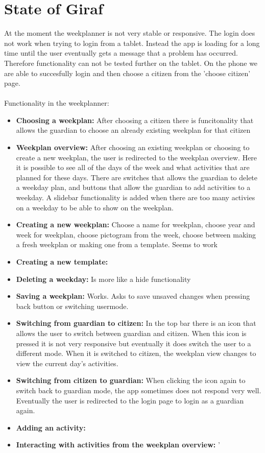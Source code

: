 \section{State of Giraf}
At the moment the weekplanner is not very stable or responsive. The login does not work when trying to login from a tablet. 
Instead the app is loading for a long time until the user eventually gets a message that a problem has occurred. 
Therefore functionality can not be tested further on the tablet. 
On the phone we are able to succesfully login and then choose a citizen from the 'choose citizen' page.
\\\\
Functionality in the weekplanner:
\begin{itemize}
    \item \textbf{Choosing a weekplan:} After choosing a citizen there is funcitonality that allows the guardian to choose an already existing weekplan for that citizen
    \\
    \item \textbf{Weekplan overview:} After choosing an existing weekplan or choosing to create a new weekplan, the user is redirected to the weekplan overview. 
    Here it is possible to see all of the days of the week and what activities that are planned for these days. There are switches that allows the guardian to delete a weekday plan, and buttons that allow the guardian to add activities to a weekday. 
    A slidebar functionality is added when there are too many activies on a weekday to be able to show on the weekplan.
    \\
    \item \textbf{Creating a new weekplan:} Choose a name for weekplan, choose year and week for weekplan, choose pictogram from the week, choose between making a fresh weekplan or making one from a template. Seems to work
    \item \textbf{Creating a new template:} 
    \item \textbf{Deleting a weekday:} Is more like a hide functionality
    \item \textbf{Saving a weekplan:} Works. Asks to save unsaved changes when pressing back button or switching usermode.
    \item \textbf{Switching from guardian to citizen:} In the top bar there is an icon that allows the user to switch between guardian and citizen. 
    When this icon is pressed it is not very responsive but eventually it does switch the user to a different mode. 
    When it is switched to citizen, the weekplan view changes to view the current day's activities.
    \\
    \item \textbf{Switching from citizen to guardian:} When clicking the icon again to switch back to guardian mode, the app sometimes does not respond very well. 
    Eventually the user is redirected to the login page to login as a guardian again.
    \\
    \item \textbf{Adding an activity:} 

    \item \textbf{Interacting with activities from the weekplan overview:} '
    \\
\end{itemize}